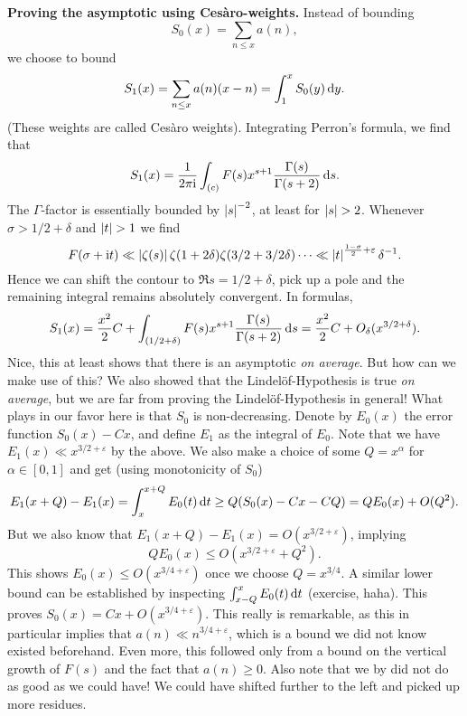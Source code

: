 \documentclass[a4paper,11pt]{article}
\begin{document}
\textbf{Proving the asymptotic using Cesàro-weights.} Instead of bounding 
\[
    S_0(x) = \sum_{n \leq x} a(n),
\]
we choose to bound
\[
    S_1(x) = \sum_{n \leq x} a(n) (x-n) = \int_1^x S_0(y) \mathrm{\,d} y.
\]
(These weights are called Cesàro weights). 
Integrating Perron's formula, we find that 
\[
    S_1(x) = \frac{1}{2 \pi \mathrm i} \int_{(c)} F(s) x^{s+1} \frac{\Gamma(s)}{\Gamma(s+2)} \mathrm{\,d} s.
\]
The $\Gamma$-factor is essentially bounded by $\left\lvert s \right\rvert^{-2}$, at least for 
$\left\lvert s \right\rvert > 2$. Whenever $\sigma > 1/2 + \delta$ and $\left\lvert t \right\rvert > 1$ we find  
$$F(\sigma + \mathrm i t) \ll \left\lvert \zeta(s) \right\rvert \zeta(1+2\delta) \zeta(3/2+3/2\delta) \cdots
\ll \left\lvert t \right\rvert^{\frac {1-\sigma}2 + \varepsilon} \delta^{-1}.$$
Hence we can shift the contour to $\Re s = 1/2+\delta$, pick up a pole and the 
remaining integral remains absolutely convergent. In formulas,
\[
    S_1(x) = \frac{x^2}2 C + \int_{(1/2+\delta)} F(s) x^{s+1}
    \frac{\Gamma(s)}{\Gamma(s+2)} \mathrm{\,d} s = \frac{x^2}2 C +
    O_\delta(x^{3/2+\delta}).
\]
Nice, this at least shows that there is an asymptotic \textit{on average}. But
how can we make use of this? We also showed that the Lindelöf-Hypothesis is true
\textit{on average}, but we are far from proving the Lindelöf-Hypothesis in
general! What plays in our favor here is that $S_0$ is non-decreasing. Denote
by $E_0(x)$ the error function $S_0(x) - Cx$, and define $E_1$ as the integral
of $E_0$. Note that we have $E_1(x) \ll x^{3/2+\varepsilon}$ by the above. 
We also make a choice of some $Q = x^\alpha$ for $\alpha \in [0,1]$ and get
(using monotonicity of $S_0$)
\[
    E_1(x+Q)-E_1(x) = \int_x^{x+Q} E_0(t) \mathrm{\,d} t \geq Q(S_0(x) - Cx - CQ) = QE_0(x) + O(Q^2).
\]
But we also know that $E_1(x+Q)-E_1(x) = O(x^{3/2+\varepsilon})$, implying
\[
    QE_0(x) \leq O(x^{3/2+\varepsilon}+Q^2).
\]
This shows $E_0(x) \leq O(x^{3/4+\varepsilon})$ once we choose $Q=x^{3/4}$. A similar
lower bound can be established by inspecting $\int_{x-Q}^x E_0(t) \mathrm{\,d} t$ (exercise, 
haha). This proves $S_0(x) = Cx + O(x^{3/4+\varepsilon})$. This really is remarkable,
as this in particular implies that $a(n) \ll n^{3/4 + \varepsilon}$, which is a 
bound we did not know existed beforehand. Even more, this followed only from a
bound on the vertical growth of $F(s)$ and the fact 
that $a(n) \geq 0$. Also note that we by did not do as good as we could have! 
We could have shifted further to the left and picked up more residues. 


\contactend
\end{document}
